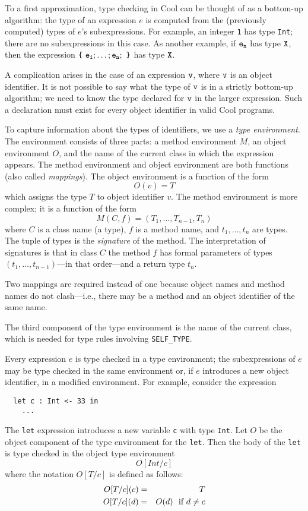 \documentclass[11pt]{article}
\newcommand{\mif}{\m{\rm if\ }}
\newcommand {\m}{\mbox}
\def\C#1{{\tt{}#1}}
\begin{document}
To a first approximation, type checking in Cool can be thought of as
a bottom-up algorithm: the type of an expression $e$ is computed from the
(previously computed) types of $e$'s subexpressions.  For example,
an integer {\tt 1} has type {\tt Int}; there are no subexpressions in
this case.  As another example, if $\tt e_n$ has type $\tt X$, then
the expression $\tt \m{\tt \{}\ e_1; \ldots; e_n;\ \m{\tt \}}$ has 
type $\tt X$.

A complication arises in the case of an expression $\tt v$, where $\tt
v$ is an object identifier.  It is not possible to say what the type of $\tt
v$ is in a strictly bottom-up algorithm; we need to know the type
declared for $\tt v$ in the larger expression.  Such a declaration
must exist for every object identifier in valid Cool programs.

To capture information about the types of identifiers, we use a
{\em type environment}.  The environment consists of three parts:
a method environment $M$, an object environment $O$, and 
the name of the current class in which the expression appears.  
The method environment and object environment are both functions (also
called {\em mappings}).  The object environment is a function of the
form
\[  O(v) = T \]
which assigns the type $ T$ to object identifier $ v$.
The method environment is more complex; it is a function of the form
\[  M(C,f) = (T_1,\ldots,T_{n-1},T_n) \]
where $ C$ is a class name (a type), $f$ is a method name,
and $ t_1,\ldots,t_n$ are types.  The tuple of types is
the {\em signature} of the method.  The interpretation of signatures is
that in class $ C$ the method $ f$ has formal parameters of
types $ (t_1,\ldots,t_{n-1})$---in that order---and a return type $t_n$.


Two mappings are required instead of one because object names and method
names do not clash---i.e., there may be a method and an object identifier
of the same name.

The third component of the type environment is the name of the current
class, which is needed for type rules involving {\tt SELF\_TYPE}.

Every expression $e$ is type checked in a type environment;
the subexpressions of $e$ may be type checked in the same environment or,
if $e$ introduces a new object identifier, in a modified environment.
For example, consider the expression
\begin{center}
\protect\begin{verbatim}
  let c : Int <- 33 in
    ...
\end{verbatim}
\end{center}
The \C{let} expression introduces a new variable {\tt c} with type {\tt Int}.
Let $O$ be the object component of the type environment for the \C{let}.
Then the body of the \C{let} is type checked in the object type environment
\[ O[Int/c] \]
where the notation $O[T/c]$ is defined as follows:
\begin{eqnarray*}
O[T/c](c) & = & T \\
O[T/c](d) & = & O(d)\ \ \mif d \neq c
\end{eqnarray*}
\end{document}
